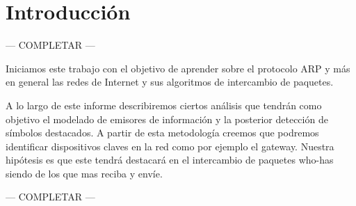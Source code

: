 \section{Introducción}

--- COMPLETAR ---

Iniciamos este trabajo con el objetivo de aprender sobre el protocolo ARP y más en general las redes de Internet y sus algoritmos de intercambio de paquetes.

A lo largo de este informe describiremos ciertos análisis que tendrán como objetivo el modelado de emisores de información y la posterior detección de símbolos destacados. A partir de esta metodología creemos que podremos identificar dispositivos claves en la red como por ejemplo el gateway. Nuestra hipótesis es que este tendrá destacará en el intercambio de paquetes who-has siendo de los que mas reciba y envíe.

--- COMPLETAR ---

